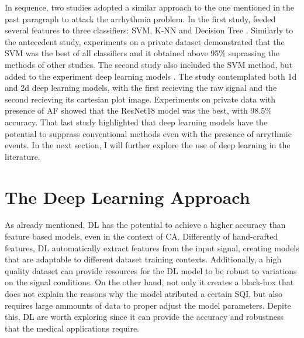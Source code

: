 In sequence, two studies adopted a similar approach to the one mentioned in the past paragraph to attack the arrhythmia problem. In the first study, \citeauthor{review-6} feeded several features to three classifiers: \acrshort{SVM}, \acrshort{K-NN} and Decision Tree \cite{review-6}. Similarly to the antecedent study, experiments on a private dataset demonstrated that the \acrshort{SVM} was the best of all classifiers and it obtained above 95\% suprassing the methods of other studies. The second study also included the \acrshort{SVM} method, but added to the experiment deep learning models \cite{review-7}. The study contemplated both 1d and 2d deep learning models, with the first recieving the raw signal and the second recieving its cartesian plot image. Experiments on private data with presence of \acrshort{AF} showed that the ResNet18 model was the best, with 98.5\% accuracy. That last study highlighted that deep learning models have the potential to supprass conventional methods even with the presence of arrythmic events. In the next section, I will further explore the use of deep learning in the literature.  

\section{The Deep Learning Approach}
\label{sec:deep_learning}

As already mentioned, \acrfull{DL} has the potential to achieve a higher accuracy than feature based models, even in the context of \acrshort{CA}. Differently of hand-crafted features, \acrshort{DL} automatically extract features from the input signal, creating models that are adaptable to different dataset training contexts. Additionally, a high quality dataset can provide resources for the \acrshort{DL} model to be robust to variations on the signal conditions. On the other hand, not only it creates a black-box that does not explain the reasons why the model atributed a certain \acrshort{SQI}, but also requires large ammounts of data to proper adjust the model parameters. Depite this, \acrshort{DL} are worth exploring since it can provide the accuracy and robustness that the medical applications require. 


